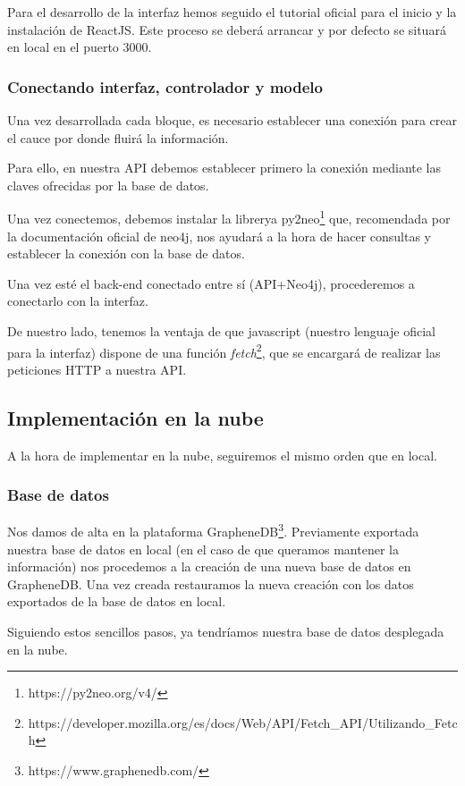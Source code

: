 Para el desarrollo de la interfaz hemos seguido el tutorial oficial para el inicio y la instalación de ReactJS. Este proceso se deberá arrancar y por defecto se situará en local en el puerto 3000.

\subsubsection{Conectando interfaz, controlador y modelo}

Una vez desarrollada cada bloque, es necesario establecer una conexión para crear el cauce por donde fluirá la información.

Para ello, en nuestra API debemos establecer primero la conexión mediante las claves ofrecidas por la base de datos\cite{connectflaskneo4j}.

Una vez conectemos, debemos instalar la librerya py2neo\footnote{https://py2neo.org/v4/} que, recomendada por la documentación oficial de neo4j, nos ayudará a la hora de hacer consultas y establecer la conexión con la base de datos.

Una vez esté el back-end conectado entre sí (API+Neo4j), procederemos a conectarlo con la interfaz.

De nuestro lado, tenemos la ventaja de que javascript (nuestro lenguaje oficial para la interfaz) dispone de una función \textit{fetch}\footnote{https://developer.mozilla.org/es/docs/Web/API/Fetch\_API/Utilizando\_Fetch}, que se encargará de realizar las peticiones HTTP a nuestra API. 

\subsection{Implementación en la nube}

A la hora de implementar en la nube, seguiremos el mismo orden que en local. 

\subsubsection{Base de datos}

Nos damos de alta en la plataforma GrapheneDB\footnote{https://www.graphenedb.com/}. Previamente exportada nuestra base de datos en local (en el caso de que queramos mantener la información) nos procedemos a la creación de una nueva base de datos en GrapheneDB. Una vez creada restauramos la nueva creación con los datos exportados de la base de datos en local\cite{graphenedb}.

Siguiendo estos sencillos pasos, ya tendríamos nuestra base de datos desplegada en la nube.


